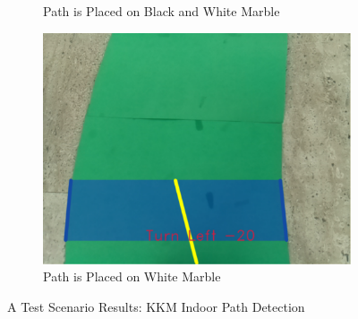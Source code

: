 \documentclass[a4paper,12pt]{article}
\begin{document}
\begin{figure}[H]
\begin{subfigure}{.31\textwidth}
\caption{\label{fig:dataP_inside-bw} Path is Placed on Black and White Marble}

\end{subfigure}
\begin{subfigure}{.31\textwidth}

\centering

\includegraphics[width=0.30\unitlength]{images/path_images/inside-ww}

\caption{\label{fig:dataP_inside-ww} Path is Placed on White Marble}

\end{subfigure}

\caption{\label{fig:dataP_inside} A Test Scenario Results: KKM Indoor Path Detection}

\end{figure}
\end{document}
